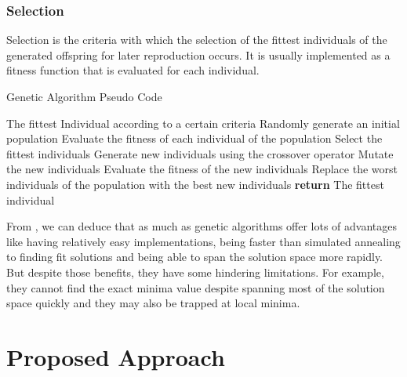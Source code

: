 \documentclass[conference]{IEEEtran}
\begin{document}
\medskip

\subsubsection{Selection}

Selection is the criteria with which the selection of the fittest individuals of the generated offspring for later reproduction occurs. It is usually implemented as a fitness function that is evaluated for each individual.

\medskip

\begin{algorithm}[H]
\caption{Genetic Algorithm Pseudo Code}
    \begin{algorithmic}[1]
    \renewcommand{\algorithmicrequire}{\textbf{Input:}}
    \renewcommand{\algorithmicensure}{\textbf{Output:}}
    \Ensure  The fittest Individual according to a certain criteria
        \State Randomly generate an initial population
        \State Evaluate the fitness of each individual of the population
            \State Select the fittest individuals
            \State Generate new individuals using the crossover operator
            \State Mutate the new individuals
            \State Evaluate the fitness of the new individuals
            \State Replace the worst individuals of the population with the best new individuals
        \EndWhile
        \State \textbf{return} The fittest individual
    \end{algorithmic}
\end{algorithm}

From \cite{b7}, we can deduce that as much as genetic algorithms offer lots of advantages like having relatively easy implementations, being faster than simulated annealing to finding fit solutions and being able to span the solution space more rapidly. But despite those benefits, they have some hindering limitations. For example, they cannot find the exact minima value despite spanning most of the solution space quickly and they may also be trapped at local minima.


\section{Proposed Approach}
\end{document}
